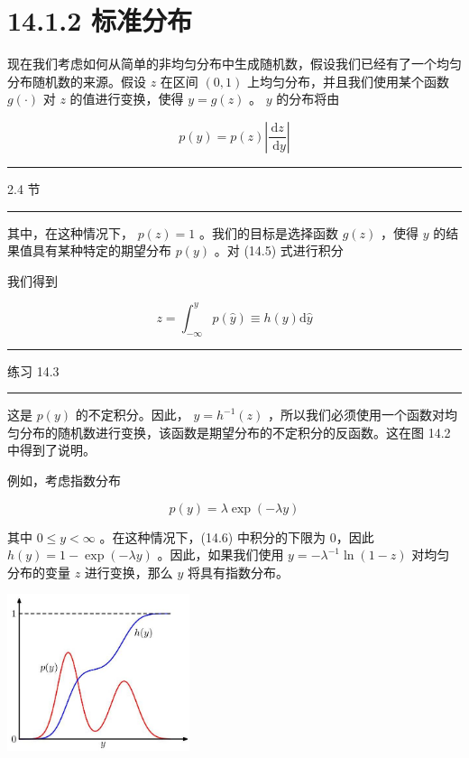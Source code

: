 \documentclass[10pt]{report}
\newcommand{\HRule}{\begin{center}\rule{0.9\linewidth}{0.2mm}\end{center}}
\begin{document}
\section*{14.1.2 标准分布}

现在我们考虑如何从简单的非均匀分布中生成随机数，假设我们已经有了一个均匀分布随机数的来源。假设 \(z\) 在区间 \(\left( {0,1}\right)\) 上均匀分布，并且我们使用某个函数 \(g\left( \cdot \right)\) 对 \(z\) 的值进行变换，使得 \(y = g\left( z\right)\) 。 \(y\) 的分布将由

\[
p\left( y\right)  = p\left( z\right) \left| \frac{\mathrm{d}z}{\mathrm{\;d}y}\right|  \tag{14.5}
\]

\HRule

2.4 节

\HRule

其中，在这种情况下， \(p\left( z\right)  = 1\) 。我们的目标是选择函数 \(g\left( z\right)\) ，使得 \(y\) 的结果值具有某种特定的期望分布 \(p\left( y\right)\) 。对 (14.5) 式进行积分

我们得到

\[
z = {\int }_{-\infty }^{y}p\left( \widehat{y}\right)  \equiv  h\left( y\right) \mathrm{d}\widehat{y} \tag{14.6}
\]

\HRule

练习 14.3

\HRule

这是 \(p\left( y\right)\) 的不定积分。因此， \(y = {h}^{-1}\left( z\right)\) ，所以我们必须使用一个函数对均匀分布的随机数进行变换，该函数是期望分布的不定积分的反函数。这在图 14.2 中得到了说明。

例如，考虑指数分布

\[
p\left( y\right)  = \lambda \exp \left( {-{\lambda y}}\right)  \tag{14.7}
\]

其中 \(0 \leq  y < \infty\) 。在这种情况下，(14.6) 中积分的下限为 0，因此 \(h\left( y\right)  = 1 - \exp \left( {-{\lambda y}}\right)\) 。因此，如果我们使用 \(y =  - {\lambda }^{-1}\ln \left( {1 - z}\right)\) 对均匀分布的变量 \(z\) 进行变换，那么 \(y\) 将具有指数分布。

\begin{center}
\includegraphics[max width=0.4\textwidth]{images/0194e279-9b28-703a-88f4-c3ac21e2010d_451_993_343_559_481_0.jpg}
\end{center}
\hspace*{3em} 
\end{document}
